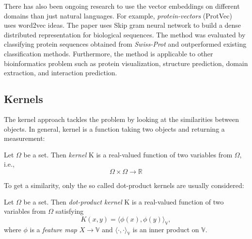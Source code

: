 There has also been ongoing research to use the vector embeddings on different domains than just natural languages. For example, \emph{protein-vectors} (ProtVec)~\cite{protvec} uses word2vec ideas.
The paper uses  Skip gram neural network to build a dense distributed representation for biological sequences. The method was evaluated by classifying protein sequences obtained from \emph{Swiss-Prot} \cite{uniprot} and outperformed existing classification methods. Furthermore, the method is applicable to other bioinformatics problem such as protein visualization, structure prediction, domain extraction, and interaction prediction.

\subsection{Kernels}
\label{section:kernels}
The kernel approach tackles the problem by looking at the similarities between objects. In general, kernel \cite{kernels} is a function taking two objects and returning a measurement:

\begin{definition}
	Let $\Omega$ be a set. Then \emph{kernel} K is a real-valued function of two variables from $\Omega$, i.e., 
	\begin{equation}
	\Omega \times \Omega \rightarrow \mathbb{R}
	\end{equation}
\end{definition}

To get a similarity, only the so called dot-product kernels are usually considered:
\begin{definition}
	Let $\Omega$ be a set. Then \emph{dot-product kernel} K is a real-valued function of two variables from $\Omega$ satisfying
	\begin{equation}
	K(x,y) = \langle\phi(x), \phi(y)\rangle_{\mathbb{V}},
	\end{equation}
	where $\phi$ is a \emph{feature map} $X \rightarrow \mathbb{V}$ and $\langle\cdot,\cdot\rangle_{\mathbb{V}}$ is an inner product on $\mathbb{V}$.
\end{definition}

